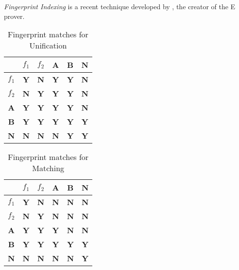 \emph{Fingerprint Indexing} is a recent technique developed by , the creator
of the E prover.

\begin{table}[h]\begin{center}
  \caption{Fingerprint matches for Unification \protect\cite[p6]{shulz12}}
  \begin{tabular}{| c || c | c | c | c | c |}
  \hline
           &  $f_1$      &  $f_2$      &  \textbf{A} &  \textbf{B} &  \textbf{N} \\ \hline \hline
  $f_1$    &  \textbf{Y} &  \textbf{N} &  \textbf{Y} &  \textbf{Y} &  \textbf{N} \\ 
  $f_2$    &  \textbf{N} &  \textbf{Y} &  \textbf{Y} &  \textbf{Y} &  \textbf{N} \\ 
\textbf{A} &  \textbf{Y} &  \textbf{Y} &  \textbf{Y} &  \textbf{Y} &  \textbf{N} \\
\textbf{B} &  \textbf{Y} &  \textbf{Y} &  \textbf{Y} &  \textbf{Y} &  \textbf{Y} \\ 
\textbf{N} &  \textbf{N} &  \textbf{N} &  \textbf{N} &  \textbf{Y} &  \textbf{Y} \\ \hline
  \end{tabular}
\end{center}\end{table}

\begin{table}[h]\begin{center}
  \caption{Fingerprint matches for Matching \protect\cite[p6]{shulz12}}
  \begin{tabular}{| c || c | c | c | c | c |}
  \hline
           &  $f_1$      &  $f_2$      &  \textbf{A} &  \textbf{B} &  \textbf{N} \\ \hline \hline
  $f_1$    &  \textbf{Y} &  \textbf{N} &  \textbf{N} &  \textbf{N} &  \textbf{N} \\ 
  $f_2$    &  \textbf{N} &  \textbf{Y} &  \textbf{N} &  \textbf{N} &  \textbf{N} \\ 
\textbf{A} &  \textbf{Y} &  \textbf{Y} &  \textbf{Y} &  \textbf{N} &  \textbf{N} \\
\textbf{B} &  \textbf{Y} &  \textbf{Y} &  \textbf{Y} &  \textbf{Y} &  \textbf{Y} \\ 
\textbf{N} &  \textbf{N} &  \textbf{N} &  \textbf{N} &  \textbf{N} &  \textbf{Y} \\ \hline
  \end{tabular}
\end{center}\end{table}

